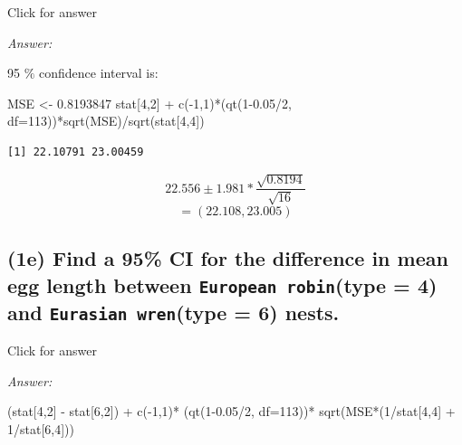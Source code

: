 \documentclass[
]{book}
\newenvironment{Shaded}{\begin{snugshade}}{\end{snugshade}}
\newcommand{\AttributeTok}[1]{\textcolor[rgb]{0.77,0.63,0.00}{#1}}
\newcommand{\DecValTok}[1]{\textcolor[rgb]{0.00,0.00,0.81}{#1}}
\newcommand{\FloatTok}[1]{\textcolor[rgb]{0.00,0.00,0.81}{#1}}
\newcommand{\FunctionTok}[1]{\textcolor[rgb]{0.00,0.00,0.00}{#1}}
\newcommand{\NormalTok}[1]{#1}
\newcommand{\OtherTok}[1]{\textcolor[rgb]{0.56,0.35,0.01}{#1}}
\newcommand{\SpecialCharTok}[1]{\textcolor[rgb]{0.00,0.00,0.00}{#1}}
\begin{document}
Click for answer

\emph{Answer:}

95 \(\%\) confidence interval is:

\begin{Shaded}
\begin{Highlighting}[]
\NormalTok{MSE }\OtherTok{\textless{}{-}} \FloatTok{0.8193847}
\NormalTok{stat[}\DecValTok{4}\NormalTok{,}\DecValTok{2}\NormalTok{] }\SpecialCharTok{+} \FunctionTok{c}\NormalTok{(}\SpecialCharTok{{-}}\DecValTok{1}\NormalTok{,}\DecValTok{1}\NormalTok{)}\SpecialCharTok{*}\NormalTok{(}\FunctionTok{qt}\NormalTok{(}\DecValTok{1}\FloatTok{{-}0.05}\SpecialCharTok{/}\DecValTok{2}\NormalTok{, }\AttributeTok{df=}\DecValTok{113}\NormalTok{))}\SpecialCharTok{*}\FunctionTok{sqrt}\NormalTok{(MSE)}\SpecialCharTok{/}\FunctionTok{sqrt}\NormalTok{(stat[}\DecValTok{4}\NormalTok{,}\DecValTok{4}\NormalTok{])}
\end{Highlighting}
\end{Shaded}

\begin{verbatim}
[1] 22.10791 23.00459
\end{verbatim}

\[22.556 \pm 1.981*\frac{\sqrt{0.8194}}{\sqrt{16}}\]
\[= (22.108, 23.005)\]

\hypertarget{e-find-a-95-ci-for-the-difference-in-mean-egg-length-between-european-robintype-4-and-eurasian-wrentype-6-nests.}{%
\subsection{\texorpdfstring{(1e) Find a 95\% CI for the difference in mean egg length between \texttt{European\ robin}(type = 4) and \texttt{Eurasian\ wren}(type = 6) nests.}{(1e) Find a 95\% CI for the difference in mean egg length between European robin(type = 4) and Eurasian wren(type = 6) nests.}}\label{e-find-a-95-ci-for-the-difference-in-mean-egg-length-between-european-robintype-4-and-eurasian-wrentype-6-nests.}}

Click for answer

\emph{Answer:}

\begin{Shaded}
\begin{Highlighting}[]
\NormalTok{(stat[}\DecValTok{4}\NormalTok{,}\DecValTok{2}\NormalTok{] }\SpecialCharTok{{-}}\NormalTok{ stat[}\DecValTok{6}\NormalTok{,}\DecValTok{2}\NormalTok{]) }\SpecialCharTok{+} \FunctionTok{c}\NormalTok{(}\SpecialCharTok{{-}}\DecValTok{1}\NormalTok{,}\DecValTok{1}\NormalTok{)}\SpecialCharTok{*}\NormalTok{ (}\FunctionTok{qt}\NormalTok{(}\DecValTok{1}\FloatTok{{-}0.05}\SpecialCharTok{/}\DecValTok{2}\NormalTok{, }\AttributeTok{df=}\DecValTok{113}\NormalTok{))}\SpecialCharTok{*} \FunctionTok{sqrt}\NormalTok{(MSE}\SpecialCharTok{*}\NormalTok{(}\DecValTok{1}\SpecialCharTok{/}\NormalTok{stat[}\DecValTok{4}\NormalTok{,}\DecValTok{4}\NormalTok{] }\SpecialCharTok{+} \DecValTok{1}\SpecialCharTok{/}\NormalTok{stat[}\DecValTok{6}\NormalTok{,}\DecValTok{4}\NormalTok{]))}
\end{Highlighting}
\end{Shaded}
\end{document}
